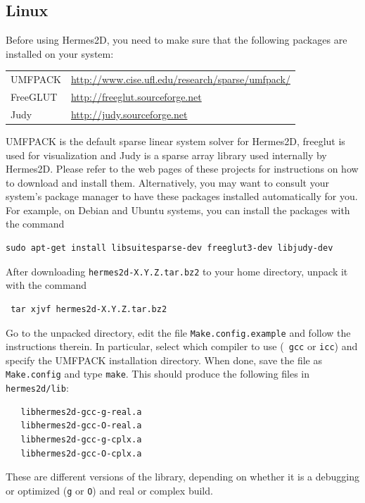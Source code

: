 
\subsection{Linux}

\lstset{language=make}

Before using Hermes2D, you need to make sure that the following packages are installed
on your system:

\begin{center}
\begin{tabular}{ll}
  UMFPACK & \url{http://www.cise.ufl.edu/research/sparse/umfpack/} \\
  FreeGLUT & \url{http://freeglut.sourceforge.net} \\
  Judy & \url{http://judy.sourceforge.net}
\end{tabular}
\end{center}

UMFPACK is the default sparse linear system solver for Hermes2D,
freeglut is  used for visualization and Judy is a sparse array library
used internally by Hermes2D. Please refer to the web pages of these projects for
instructions on how to download and install them. Alternatively, you may want to
consult your system's package manager to have these packages
installed automatically for you. For example, on Debian and Ubuntu systems, you
can install the packages with the command
\begin{lstlisting}
sudo apt-get install libsuitesparse-dev freeglut3-dev libjudy-dev
\end{lstlisting}

After downloading \verb"hermes2d-X.Y.Z.tar.bz2" to your home directory, unpack it with
the command
\begin{lstlisting}
 tar xjvf hermes2d-X.Y.Z.tar.bz2
\end{lstlisting}

Go to the unpacked directory, edit the file \verb"Make.config.example" and
follow the instructions therein. In particular, select which compiler to use ({\tt
gcc} or {\tt icc}) and specify the UMFPACK installation directory. When done,
save the file as {\tt Make.config} and type {\tt make}. This should
produce the following files in {\tt hermes2d/lib}:
{\small\begin{verbatim}
   libhermes2d-gcc-g-real.a
   libhermes2d-gcc-O-real.a
   libhermes2d-gcc-g-cplx.a
   libhermes2d-gcc-O-cplx.a
\end{verbatim}}
These are different versions of the library, depending on whether it is a debugging
or optimized ({\tt g} or {\tt O}) and real or complex build.

